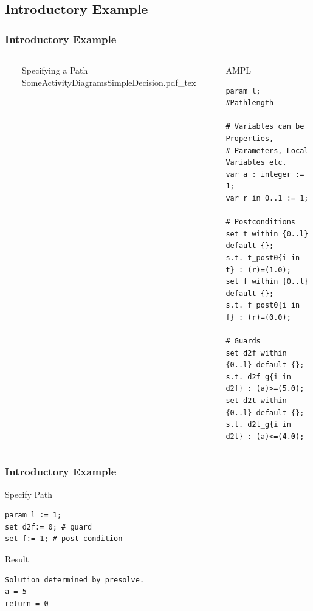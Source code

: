 \documentclass{beamer}
\begin{document}
\subsection{Introductory Example}
\begin{frame}[fragile]
\frametitle{Introductory Example}
\begin{columns}
  \ 
	\begin{block}{Specifying a Path} 
	\def\svgwidth{\textwidth}
	\scriptsize
	{SomeActivityDiagramsSimpleDecision.pdf_tex}
	\end{block} 
\column{.5\textwidth} \ 
	\begin{block}{AMPL} 
		\begin{lstlisting}[basicstyle=\ttfamily\scriptsize,language=ampl]
param l; #Pathlength

# Variables can be Properties, 
# Parameters, Local Variables etc.
var a : integer := 1;
var r in 0..1 := 1;

# Postconditions
set t within {0..l} default {};
s.t. t_post0{i in t} : (r)=(1.0);
set f within {0..l} default {};
s.t. f_post0{i in f} : (r)=(0.0);

# Guards
set d2f within {0..l} default {};
s.t. d2f_g{i in d2f} : (a)>=(5.0);
set d2t within {0..l} default {};
s.t. d2t_g{i in d2t} : (a)<=(4.0);
\end{lstlisting}
	\end{block} 
\end{columns}
\end{frame}

\begin{frame}[fragile]
\frametitle{Introductory Example}
	\begin{block}{Specify Path} 
		\begin{lstlisting}[basicstyle=\ttfamily\small,language=ampl]
param l := 1;
set d2f:= 0; # guard 
set f:= 1; # post condition
		\end{lstlisting}
	\end{block} 
	\begin{block}{Result} 
		\begin{lstlisting}[basicstyle=\ttfamily\small,language=ampl]
Solution determined by presolve.
a = 5
return = 0
		\end{lstlisting}
	\end{block}
\end{frame}


\end{document}
